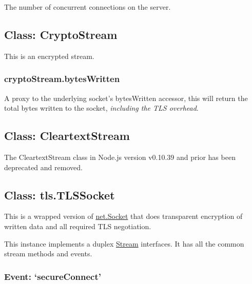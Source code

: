 The number of concurrent connections on the server.

\subsection{Class: CryptoStream}\label{class-cryptostream}

\begin{Shaded}
\begin{Highlighting}[]
 \NormalTok{- }  
\end{Highlighting}
\end{Shaded}

This is an encrypted stream.

\subsubsection{cryptoStream.bytesWritten}\label{cryptostream.byteswritten}

A proxy to the underlying socket's bytesWritten accessor, this will
return the total bytes written to the socket, \emph{including the TLS
overhead}.

\subsection{Class: CleartextStream}\label{class-cleartextstream}

The CleartextStream class in Node.js version v0.10.39 and prior has been
deprecated and removed.

\subsection{Class: tls.TLSSocket}\label{class-tls.tlssocket-1}

This is a wrapped version of
\href{net.html\#net_class_net_socket}{net.Socket} that does transparent
encryption of written data and all required TLS negotiation.

This instance implements a duplex
\href{stream.html\#stream_stream}{Stream} interfaces. It has all the
common stream methods and events.

\subsubsection{\texorpdfstring{Event:
`secureConnect'}{Event: secureConnect}}\label{event-secureconnect}

